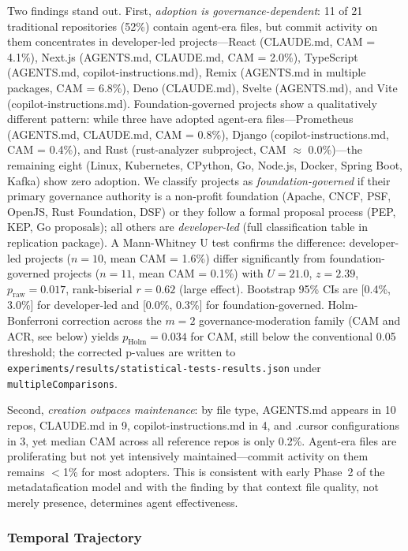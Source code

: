 \documentclass[12pt]{article}
\begin{document}
Two findings stand out. First, \textit{adoption is governance-dependent}: 11 of 21 traditional repositories (52\%) contain agent-era files, but commit activity on them concentrates in developer-led projects---React (CLAUDE.md, CAM = 4.1\%), Next.js (AGENTS.md, CLAUDE.md, CAM = 2.0\%), TypeScript (AGENTS.md, copilot-instructions.md), Remix (AGENTS.md in multiple packages, CAM = 6.8\%), Deno (CLAUDE.md), Svelte (AGENTS.md), and Vite (copilot-instructions.md). Foundation-governed projects show a qualitatively different pattern: while three have adopted agent-era files---Prometheus (AGENTS.md, CLAUDE.md, CAM = 0.8\%), Django (copilot-instructions.md, CAM = 0.4\%), and Rust (rust-analyzer subproject, CAM $\approx$ 0.0\%)---the remaining eight (Linux, Kubernetes, CPython, Go, Node.js, Docker, Spring Boot, Kafka) show zero adoption. We classify projects as \textit{foundation-governed} if their primary governance authority is a non-profit foundation (Apache, CNCF, PSF, OpenJS, Rust Foundation, DSF) or they follow a formal proposal process (PEP, KEP, Go proposals); all others are \textit{developer-led} (full classification table in replication package). A Mann-Whitney U test confirms the difference: developer-led projects ($n=10$, mean CAM = 1.6\%) differ significantly from foundation-governed projects ($n=11$, mean CAM = 0.1\%) with $U=21.0$, $z=2.39$, $p_\text{raw}=0.017$, rank-biserial $r=0.62$ (large effect). Bootstrap 95\% CIs are [0.4\%, 3.0\%] for developer-led and [0.0\%, 0.3\%] for foundation-governed. Holm-Bonferroni correction across the $m=2$ governance-moderation family (CAM and ACR, see below) yields $p_\text{Holm}=0.034$ for CAM, still below the conventional 0.05 threshold; the corrected p-values are written to \texttt{experiments/results/statistical-tests-results.json} under \texttt{multipleComparisons}.

Second, \textit{creation outpaces maintenance}: by file type, AGENTS.md appears in 10 repos, CLAUDE.md in 9, copilot-instructions.md in 4, and .cursor configurations in 3, yet median CAM across all reference repos is only 0.2\%. Agent-era files are proliferating but not yet intensively maintained---commit activity on them remains $<$1\% for most adopters. This is consistent with early Phase~2 of the metadatafication model and with the finding by \citet{gloaguen2026evaluatingagentsmd} that context file quality, not merely presence, determines agent effectiveness.

\subsubsection{Temporal Trajectory}
\end{document}
